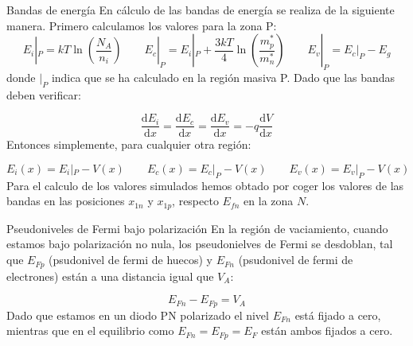 \documentclass[aspectratio=169,xcolor=dvipsnames]{beamer}
\newcommand{\parentesis}[1]{\left( #1  \right)}
\newcommand{\D}{\mathrm{d}}
\newcommand{\derivadas}[2]{\frac{\D #1}{\D #2}}
\begin{document}
\begin{frame}{Bandas de energía}
    En cálculo de las bandas de energía se realiza de la siguiente manera. Primero calculamos los valores para la zona P:  
    \begin{equation*}
        E_i|_P = kT \ln \parentesis{\frac{N_{A}}{n_i}} \qquad E_c |_P = E_i |_P + \frac{3kT}{4}\ln \parentesis{\frac{m_p^*}{m_n^*} } \qquad E_v|_P  =E_c|_P-E_g 
    \end{equation*}
    donde $|_{P}$ indica que se ha calculado en la región masiva P. Dado que las bandas deben verificar:

    \begin{equation}
        \derivadas{E_i}{x} = \derivadas{E_c}{x} = \derivadas{E_v}{x} = - q \derivadas{V}{x}
    \end{equation}
    Entonces simplemente, para cualquier otra región:

    \begin{equation}
        E_i(x) = E_i|_P - V(x) \qquad 
        E_c(x) = E_c|_P - V(x) \qquad 
        E_v(x) = E_v|_P - V(x)
    \end{equation}
    Para el calculo de los valores simulados hemos obtado por coger los valores de las bandas en las posiciones $x_{1n}$ y $x_{1p}$, respecto $E_{fn}$ en la zona $N$. 
\end{frame}    
\begin{frame}{Pseudoniveles de Fermi bajo polarización}
    En la región de vaciamiento, cuando estamos bajo polarización no nula, los pseudonielves de Fermi se desdoblan, tal que $E_{Fp}$ (psudonivel de fermi de huecos) y $E_{Fn}$ (psudonivel de fermi de electrones) están a una distancia igual que $V_A$:

    \begin{equation*}
        E_{Fn}-E_{Fp} = V_A
    \end{equation*}
    Dado que estamos en un diodo PN polarizado el nivel $E_{Fn}$ está fijado a cero, mientras que en el equilibrio como $E_{Fn}=E_{Fp}=E_F$ están ambos fijados a cero.

\end{frame}
\end{document}
